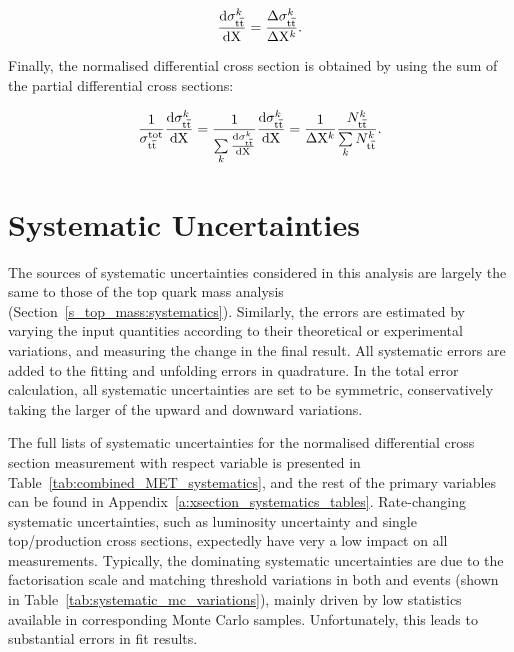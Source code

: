 \begin{equation}
\label{eq:differential_xsection}
\frac{\mathrm{d}\sigma_{\mathrm{t}\overline{\mathrm{t}}}^k}{\mathrm{d} \mathrm{X}} = \frac{\Delta\sigma_{\mathrm{t}\overline{\mathrm{t}}}^k}{\Delta \mathrm{X}^k }.
\end{equation}

Finally, the normalised differential cross section is obtained by using the sum of the partial differential cross
sections:

\begin{equation}
\label{eq:normalised_differential_xsection}
\frac{1}{\sigma_{\mathrm{t}\overline{\mathrm{t}}}^\mathrm{tot}} \frac{\mathrm{d}\sigma_{\mathrm{t}\overline{\mathrm{t}}}^k}{\mathrm{d} \mathrm{X}} =
\frac{1}{\sum\limits_k{\frac{\mathrm{d}\sigma_{\mathrm{t}\overline{\mathrm{t}}}^k}{\mathrm{d} \mathrm{X}}}} \frac{\mathrm{d}\sigma_{\mathrm{t}\overline{\mathrm{t}}}^k}{\mathrm{d}
\mathrm{X}} = \frac{1}{\Delta \mathrm{X}^k} \frac{N_{\mathrm{t}\overline{\mathrm{t}}}^k}{\sum\limits_k N_{\mathrm{t}\overline{\mathrm{t}}}^k}.
\end{equation}

\clearpage
\section{Systematic Uncertainties}
\label{s_xsection:systematics}
The sources of systematic uncertainties considered in this analysis are largely the same to those of the top quark mass
analysis (Section~\ref{s_top_mass:systematics}). Similarly, the errors are estimated by varying the input quantities
according to their theoretical or experimental variations, and measuring the change in the final result. All systematic
errors are added to the fitting and unfolding errors in quadrature. In the total error calculation, all systematic
uncertainties are set to be symmetric, conservatively taking the larger of the upward and downward variations.

The full lists of systematic uncertainties for the normalised differential cross section measurement with respect \MET
variable is presented in Table~\ref{tab:combined_MET_systematics}, and the rest of the primary variables can be found in
Appendix~\ref{a:xsection_systematics_tables}. Rate-changing systematic uncertainties, such as luminosity uncertainty and
single top/\ttbar production cross sections, expectedly have very a low impact on all measurements. Typically, the
dominating systematic uncertainties are due to the factorisation scale and matching threshold variations in both \VpJets
and \ttbar events (shown in Table~\ref{tab:systematic_mc_variations}), mainly driven by low statistics available in
corresponding Monte Carlo samples. Unfortunately, this leads to substantial errors in fit results.

